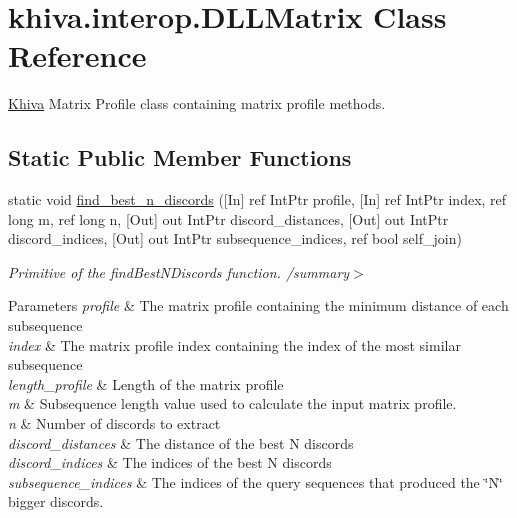 \hypertarget{classkhiva_1_1interop_1_1_d_l_l_matrix}{}\section{khiva.\+interop.\+D\+L\+L\+Matrix Class Reference}
\label{classkhiva_1_1interop_1_1_d_l_l_matrix}


\mbox{\hyperlink{classkhiva_1_1_khiva}{Khiva}} Matrix Profile class containing matrix profile methods.  


\subsection*{Static Public Member Functions}
\begin{DoxyCompactItemize}
\item 
static void \mbox{\hyperlink{classkhiva_1_1interop_1_1_d_l_l_matrix_a44df4cfe48e7ef33f60eda2c88889d1e}{find\+\_\+best\+\_\+n\+\_\+discords}} (\mbox{[}In\mbox{]} ref Int\+Ptr profile, \mbox{[}In\mbox{]} ref Int\+Ptr index, ref long m, ref long n, \mbox{[}Out\mbox{]} out Int\+Ptr discord\+\_\+distances, \mbox{[}Out\mbox{]} out Int\+Ptr discord\+\_\+indices, \mbox{[}Out\mbox{]} out Int\+Ptr subsequence\+\_\+indices, ref bool self\+\_\+join)
\begin{DoxyCompactList}\small\item\em Primitive of the find\+Best\+N\+Discords function. /summary$>$ 
\begin{DoxyParams}{Parameters}
{\em profile} & The matrix profile containing the minimum distance of each subsequence\\
\hline
{\em index} & The matrix profile index containing the index of the most similar subsequence\\
\hline
{\em length\+\_\+profile} & Length of the matrix profile\\
\hline
{\em m} & Subsequence length value used to calculate the input matrix profile.\\
\hline
{\em n} & Number of discords to extract\\
\hline
{\em discord\+\_\+distances} & The distance of the best N discords\\
\hline
{\em discord\+\_\+indices} & The indices of the best N discords\\
\hline
{\em subsequence\+\_\+indices} & The indices of the query sequences that produced the \char`\"{}\+N\char`\"{} bigger discords.\\
\hline

\end{DoxyParams}
\end{DoxyCompactList}
\end{DoxyCompactItemize}
